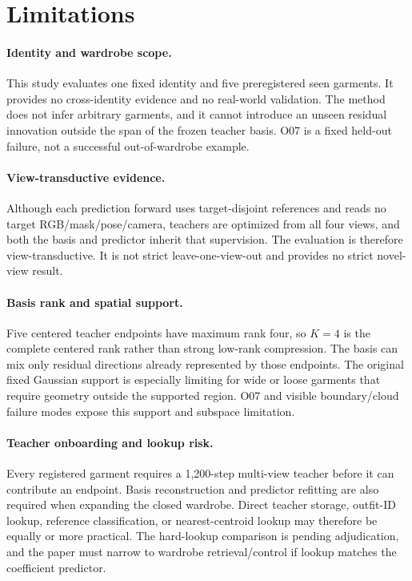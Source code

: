 \section{Limitations}

\paragraph{Identity and wardrobe scope.}
This study evaluates one fixed identity and five preregistered seen garments. It provides no cross-identity evidence and no real-world validation. The method does not infer arbitrary garments, and it cannot introduce an unseen residual innovation outside the span of the frozen teacher basis. O07 is a fixed held-out failure, not a successful out-of-wardrobe example.

\paragraph{View-transductive evidence.}
Although each prediction forward uses target-disjoint references and reads no target RGB/mask/pose/camera, teachers are optimized from all four views, and both the basis and predictor inherit that supervision. The evaluation is therefore view-transductive. It is not strict leave-one-view-out and provides no strict novel-view result.

\paragraph{Basis rank and spatial support.}
Five centered teacher endpoints have maximum rank four, so $K=4$ is the complete centered rank rather than strong low-rank compression. The basis can mix only residual directions already represented by those endpoints. The original fixed Gaussian support is especially limiting for wide or loose garments that require geometry outside the supported region. O07 and visible boundary/cloud failure modes expose this support and subspace limitation.

\paragraph{Teacher onboarding and lookup risk.}
Every registered garment requires a 1,200-step multi-view teacher before it can contribute an endpoint. Basis reconstruction and predictor refitting are also required when expanding the closed wardrobe. Direct teacher storage, outfit-ID lookup, reference classification, or nearest-centroid lookup may therefore be equally or more practical. The hard-lookup comparison is pending adjudication, and the paper must narrow to wardrobe retrieval/control if lookup matches the coefficient predictor.

